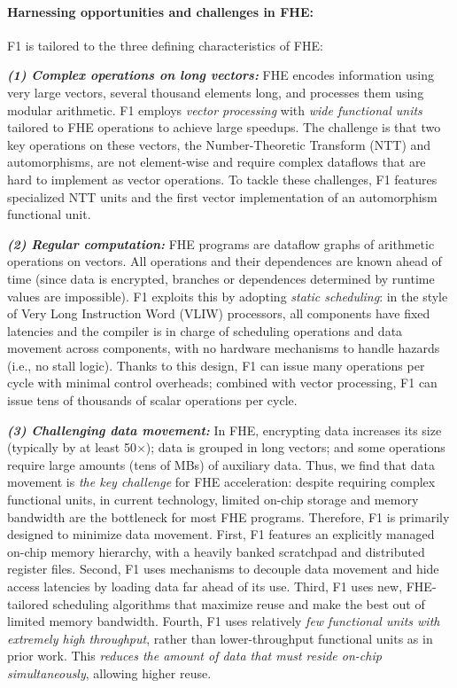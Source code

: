 \paragraph{Harnessing opportunities and challenges in FHE:}
F1 is tailored to the three defining characteristics of FHE:

\noindent \textbf{\emph{(1) Complex operations on long vectors:}}
FHE encodes information using very large vectors, several thousand elements
long, and processes them using modular arithmetic. F1 employs \emph{vector
processing} with \emph{wide functional units} tailored to FHE operations to
achieve large speedups. The challenge is that two key operations on these
vectors, the Number-Theoretic Transform (NTT) and automorphisms, are not
element-wise and require complex dataflows that are hard to implement as vector
operations. To tackle these challenges, F1 features specialized NTT units and
the first vector implementation of an automorphism functional unit.

\noindent \textbf{\emph{(2) Regular computation:}}
FHE programs are dataflow graphs of arithmetic operations on vectors. All
operations and their dependences are known ahead of time (since data is
encrypted, branches or dependences determined by runtime values are
impossible). F1 exploits this by adopting \emph{static scheduling}: in the
style of Very Long Instruction Word (VLIW) processors, all components have
fixed latencies and the compiler is in charge of scheduling operations and data
movement across components, with no hardware mechanisms to handle hazards
(i.e., no stall logic). Thanks to this design, F1 can issue many operations per
cycle with minimal control overheads; combined with vector processing, F1 can
issue tens of thousands of scalar operations per cycle.

\noindent \textbf{\emph{(3) Challenging data movement:}}
In FHE, encrypting data increases its size (typically by at least 50$\times$);
data is grouped in long vectors; and some operations require large amounts
(tens of MBs) of auxiliary data. Thus, we find that data movement is \emph{the
key challenge} for FHE acceleration: despite requiring complex functional
units, in current technology, limited on-chip storage and memory bandwidth are
the bottleneck for most FHE programs. Therefore, F1 is primarily designed to
minimize data movement. First, F1 features an explicitly managed on-chip memory
hierarchy, with a heavily banked scratchpad and distributed register files.
Second, F1 uses mechanisms to decouple data movement and hide access latencies
by loading data far ahead of its use. Third, F1 uses new, FHE-tailored
scheduling algorithms that maximize reuse and make the best out of limited
memory bandwidth. Fourth, F1 uses relatively \emph{few functional units with
extremely high throughput}, rather than lower-throughput functional units as in
prior work. This \emph{reduces the amount of data that must reside on-chip
simultaneously}, allowing higher reuse.

